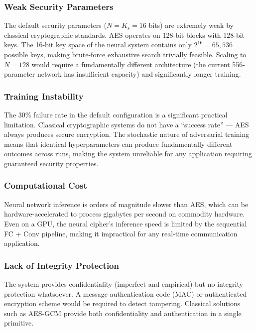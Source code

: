 \documentclass[12pt, a4paper]{article}
\begin{document}
\subsubsection*{Weak Security Parameters}

The default security parameters ($N = K_s = 16$ bits) are extremely
weak by classical cryptographic standards. AES operates on 128-bit
blocks with 128-bit keys. The 16-bit key space of the neural system
contains only $2^{16} = 65{,}536$ possible keys, making brute-force
exhaustive search trivially feasible. Scaling to $N = 128$ would
require a fundamentally different architecture (the current 556-parameter
network has insufficient capacity) and significantly longer training.

\subsubsection*{Training Instability}

The 30\% failure rate in the default configuration is a significant
practical limitation. Classical cryptographic systems do not have a
``success rate'' --- AES always produces secure encryption. The
stochastic nature of adversarial training means that identical
hyperparameters can produce fundamentally different outcomes across
runs, making the system unreliable for any application requiring
guaranteed security properties.

\subsubsection*{Computational Cost}

Neural network inference is orders of magnitude slower than AES,
which can be hardware-accelerated to process gigabytes per second
on commodity hardware. Even on a GPU, the neural cipher's inference
speed is limited by the sequential FC + Conv pipeline, making it
impractical for any real-time communication application.

\subsubsection*{Lack of Integrity Protection}

The system provides confidentiality (imperfect and empirical) but
no integrity protection whatsoever. A message authentication code
(MAC) or authenticated encryption scheme would be required to detect
tampering. Classical solutions such as AES-GCM provide both
confidentiality and authentication in a single primitive.
\end{document}
